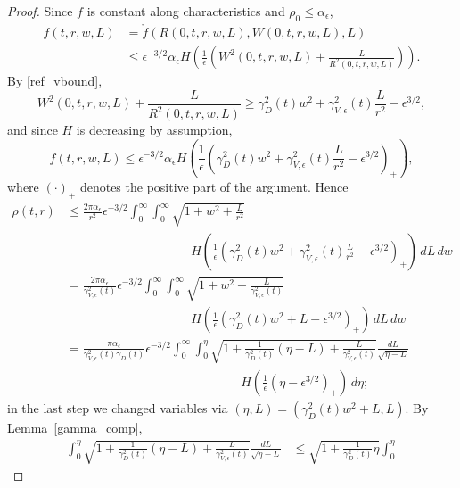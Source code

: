 \documentclass[11pt]{article}
\begin{document}
\begin{proof}
  Since $f$ is constant along characteristics and
  $\rho_0\leq \alpha_\epsilon$,
  \begin{align*}
    f(t,r,w,L)
    &= \mathring f (R(0,t,r,w,L),W(0,t,r,w,L),L)\\
    &\leq
    \epsilon^{-3/2} \alpha_\epsilon
    H\left(\frac{1}{\epsilon}\left(W^2(0,t,r,w,L)+\frac{L}{R^2(0,t,r,w,L)}
    \right)\right).
  \end{align*}
  By \eqref{ref_vbound},
  \[
  W^2(0,t,r,w,L)+\frac{L}{R^2(0,t,r,w,L)} \geq
  \gamma_D^2(t) w^2 + \gamma^2_{V,\epsilon}(t) \frac{L}{r^2}-\epsilon^{3/2},
  \]
  and since $H$ is decreasing by assumption,
  \[
  f(t,r,w,L)  \leq 
  \epsilon^{-3/2} \alpha_\epsilon
  H\left(\frac{1}{\epsilon}
  \left(\gamma_D^2(t) w^2 + \gamma^2_{V,\epsilon}(t) \frac{L}{r^2}
  -\epsilon^{3/2}\right)_+\right),
  \]
  where $(\cdot)_+$ denotes the positive part of the argument. Hence
  \begin{align*}
    \rho(t,r)
    &
    \leq 
    \frac{2 \pi \alpha_\epsilon}{r^2}\epsilon^{-3/2}
    \int_0^\infty\int_0^\infty \sqrt{1+w^2 +\frac{L}{r^2}}\\
    &
    \qquad\qquad\qquad\qquad\qquad
    H\left(\frac{1}{\epsilon}
    \left(\gamma_D^2(t) w^2 + \gamma^2_{V,\epsilon}(t) \frac{L}{r^2}
    -\epsilon^{3/2}\right)_+\right)
    \,dL\,dw\\
    &
    = 
    \frac{2 \pi \alpha_\epsilon}{\gamma^2_{V,\epsilon}(t)}\epsilon^{-3/2}
    \int_0^\infty\int_0^\infty \sqrt{1+w^2 +\frac{L}{\gamma^2_{V,\epsilon}(t)}}\\
    &
    \qquad\qquad\qquad\qquad\qquad
    H\left(\frac{1}{\epsilon}
    \left(\gamma_D^2(t) w^2 +  L -\epsilon^{3/2}\right)_+\right)
    \,dL\,dw\\
    &
    = 
    \frac{\pi \alpha_\epsilon}{\gamma^2_{V,\epsilon}(t) \gamma_D(t)}\epsilon^{-3/2}
    \int_0^\infty\int_0^\eta
    \sqrt{1+\frac{1}{\gamma_D^2(t)} (\eta - L) +\frac{L}{\gamma^2_{V,\epsilon}(t)}}
    \frac{dL}{\sqrt{\eta-L}}\\
    &
    \qquad\qquad\qquad\qquad\qquad\qquad\qquad
    H\left(\frac{1}{\epsilon}
    \left(\eta -\epsilon^{3/2}\right)_+ \right)\, d\eta;
  \end{align*}
  in the last step we changed variables via
  $(\eta,L)=(\gamma_D^2(t) w^2 +  L,L)$.
  By Lemma~\ref{gamma_comp},
  \begin{align*}
    \int_0^\eta
    \sqrt{1+\frac{1}{\gamma_D^2(t)} (\eta - L) +\frac{L}{\gamma^2_{V,\epsilon}(t)}}
    \frac{dL}{\sqrt{\eta-L}}
    &\leq
    \sqrt{1+\frac{1}{\gamma_D^2(t)} \eta} \int_0^\eta

\end{align*}
\end{proof}
\end{document}
